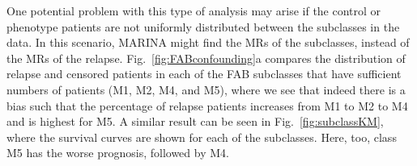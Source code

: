 \documentclass[10pt, letterpaper, twoside, english]{article}
\begin{document}
One potential problem with this type of analysis may arise if the control or phenotype patients 
are not uniformly distributed between the subclasses in the data.
In this scenario, MARINA might find the MRs of the subclasses, 
instead of the MRs of the relapse.
Fig.~\ref{fig:FABconfounding}a 
compares the distribution of relapse and censored patients in each of the FAB subclasses
that have sufficient numbers of patients (M1, M2, M4, and M5),
where we see that indeed there is a bias such that the percentage of relapse patients
increases from M1 to M2 to M4 and is highest for M5.
A similar result can be seen in Fig.~\ref{fig:subclassKM}, 
where the survival curves are shown for each of the subclasses.
Here, too, class M5 has the worse prognosis, followed by M4.



\end{document}
